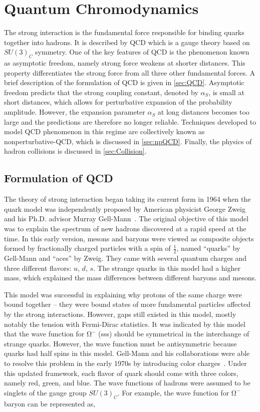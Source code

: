 \chapter{Quantum Chromodynamics}
\label{chap:QCD}

The strong interaction is the fundamental force responsible for binding quarks together into hadrons. It is described by \ac{QCD} which is a gauge theory based on $SU(3)_{C}$ symmetry. One of the key features of \ac{QCD} is the phenomenon known as asymptotic freedom, namely strong force weakens at shorter distances. This property differentiates the strong force from all three other fundamental forces. A brief description of the formulation of \ac{QCD} is given in \autoref{sec:QCD}. Asymptotic freedom predicts that the strong coupling constant, denoted by $\alpha_{S}$, is small at short distances, which allows for perturbative expansion of the probability amplitude. However, the expansion parameter $\alpha_{S}$ at long distances becomes too large and the predictions are therefore no longer reliable. Techniques developed to model \ac{QCD} phenomenon in this regime are collectively known as nonperturbative-\ac{QCD}, which is discussed in \autoref{sec:npQCD}. Finally, the physics of hadron collisions is discussed in \autoref{sec:Collision}.

\section{Formulation of QCD}
\label{sec:QCD}

The theory of strong interaction began taking its current form in 1964 when the quark model was independently proposed by American physicist George Zweig~\cite{Zweig:1964ruk} and his Ph.D. advisor Murray Gell-Mann~\cite{Gell-Mann:1964ewy}. The original objective of this model was to explain the spectrum of new hadrons discovered at a rapid speed at the time. In this early version, mesons and baryons were viewed as composite objects formed by fractionally charged particles with a spin of $\frac{1}{2}$, named ``quarks'' by Gell-Mann and ``aces'' by Zweig. They came with several quantum charges and three different flavors: $u$, $d$, $s$. The strange quarks in this model had a higher mass, which explained the mass differences between different baryons and mesons.

This model was successful in explaining why protons of the same charge were bound together -- they were bound states of more fundamental particles affected by the strong interactions. However, gaps still existed in this model, mostly notably the tension with Fermi-Dirac statistics. It was indicated by this model that the wave function for $\mathrm{\Omega^{-}}$ (sss) should be symmetrical in the interchange of strange quarks. However, the wave function must be antisymmetric because quarks had half spins in this model. Gell-Mann and his collaborations were able to resolve this problem in the early 1970s by introducing color charges~\cite{Fritzsch:1973pi}. Under this updated framework, each flavor of quark should come with three colors, namely red, green, and blue. The wave functions of hadrons were assumed to be singlets of the gauge group $SU(3)_{C}$. For example, the wave function for $\mathrm{\Omega^{-}}$ baryon can be represented as,

